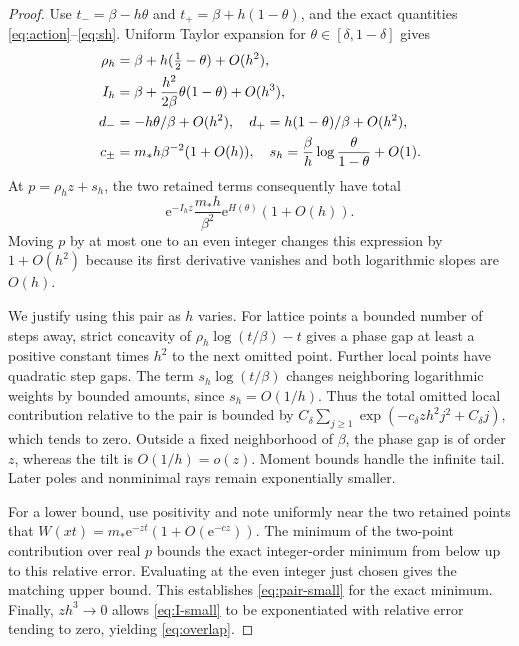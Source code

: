 \documentclass[11pt,a4paper]{article}
\numberwithin{equation}{section}
\theoremstyle{definition}\newtheorem{definition}[theorem]{Definition}
\theoremstyle{remark}\newtheorem{remark}[theorem]{Remark}
\newcommand{\e}{\mathrm e}
\newcommand{\mstar}{m_*}
\begin{document}
\begin{proof}
Use $t_-=\beta-h\theta$ and $t_+=\beta+h(1-\theta)$, and the exact
quantities \eqref{eq:action}--\eqref{eq:sh}. Uniform Taylor expansion for
$\theta\in[\delta,1-\delta]$ gives
\begin{align}
 \rho_h&=\beta+h(\tfrac12-\theta)+O(h^2),\label{eq:rho-small}\\
 I_h&=\beta+\frac{h^2}{2\beta}\theta(1-\theta)+O(h^3),
 \label{eq:I-small}\\
 d_-&=-h\theta/\beta+O(h^2),\quad
 d_+=h(1-\theta)/\beta+O(h^2),\notag\\
 c_\pm&=\mstar h\beta^{-2}(1+O(h)),\quad
 s_h=\frac\beta h\log\frac{\theta}{1-\theta}+O(1).
 \label{eq:s-small}
\end{align}
At $p=\rho_hz+s_h$, the two retained terms consequently have total
\begin{equation}
 \e^{-I_hz}\frac{\mstar h}{\beta^2}
           \e^{H(\theta)}(1+O(h)).
 \label{eq:pair-small}
\end{equation}
Moving $p$ by at most one to an even integer changes this expression by
$1+O(h^2)$ because its first derivative vanishes and both logarithmic
slopes are $O(h)$.

We justify using this pair as $h$ varies. For lattice points a bounded
number of steps away, strict concavity of
$\rho_h\log(t/\beta)-t$ gives a phase gap at least a positive constant
times $h^2$ to the next omitted point. Further local points have quadratic
step gaps. The term $s_h\log(t/\beta)$ changes neighboring logarithmic
weights by bounded amounts, since $s_h=O(1/h)$. Thus the total omitted
local contribution relative to the pair is bounded by
$C_\delta\sum_{j\ge1}\exp(-c_\delta zh^2j^2+C_\delta j)$, which tends
to zero. Outside a fixed neighborhood of $\beta$, the phase gap is of
order $z$, whereas the tilt is $O(1/h)=o(z)$. Moment bounds handle the
infinite tail. Later poles and nonminimal rays remain exponentially
smaller.

For a lower bound, use positivity and note uniformly near the two
retained points that
$W(xt)=\mstar\e^{-zt}(1+O(\e^{-cz}))$.
The minimum of the two-point contribution over real $p$ bounds the exact
integer-order minimum from below up to this relative error. Evaluating
at the even integer just chosen gives the matching upper bound.
This establishes \eqref{eq:pair-small} for the exact minimum. Finally,
$zh^3\to0$ allows \eqref{eq:I-small} to be exponentiated with relative
error tending to zero, yielding \eqref{eq:overlap}.
\end{proof}
\end{document}
